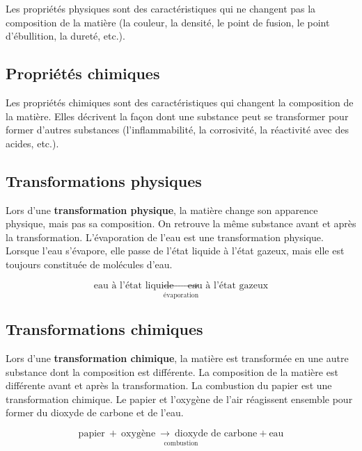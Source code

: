 \documentclass[
  11pt,
  french,
  a4paper,
  openany]{book}
\begin{document}
Les propriétés physiques sont des caractéristiques qui ne changent pas la composition de la matière (la couleur, la densité, le point de fusion, le point d'ébullition, la dureté, etc.).

\hypertarget{propriuxe9tuxe9s-chimiques}{%
\subsection{Propriétés chimiques}\label{propriuxe9tuxe9s-chimiques}}

Les propriétés chimiques sont des caractéristiques qui changent la composition de la matière. Elles décrivent la façon dont une substance peut se transformer pour former d'autres substances (l'inflammabilité, la corrosivité, la réactivité avec des acides, etc.).

\hypertarget{transformations-physiques}{%
\subsection{Transformations physiques}\label{transformations-physiques}}

Lors d'une \textbf{transformation physique}, la matière change son apparence physique, mais pas sa composition. On retrouve la même substance avant et après la transformation. L'évaporation de l'eau est une transformation physique. Lorsque l'eau s'évapore, elle passe de l'état liquide à l'état gazeux, mais elle est toujours constituée de molécules d'eau.

\[ \underset{\text{évaporation}}{\text{eau à l'état liquide} \ \longrightarrow \ \text{eau à l'état gazeux}} \]

\hypertarget{transformations-chimiques}{%
\subsection{Transformations chimiques}\label{transformations-chimiques}}

Lors d'une \textbf{transformation chimique}, la matière est transformée en une autre substance dont la composition est différente. La composition de la matière est différente avant et après la transformation. La combustion du papier est une transformation chimique. Le papier et l'oxygène de l'air réagissent ensemble pour former du dioxyde de carbone et de l'eau.

\[ \underset{\text{combustion}}{\text{papier}\ +\ \text{oxygène} \ \longrightarrow \ \text{dioxyde de carbone} + \text{eau}} \]
\end{document}
